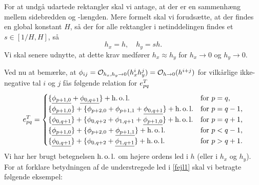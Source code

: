 For at undgå udartede rektangler skal vi antage, at der er en
sammenhæng mellem sidebredden og -længden. Mere formelt skal vi
forudsætte, at der findes en global konstant $H$, så der for alle
rektangler i netinddelingen findes et $s\in[1/H,H]$, så
\begin{equation}
  h_x=h, \quad h_y=sh.
\end{equation}
Vi skal senere udnytte, at dette krav medfører $h_x \approx h_y$ for
$h_x\rightarrow 0$ og $h_y\rightarrow 0$.

Ved nu at bemærke, at $\phi_{ij} = {\mathcal O}_{h_x,h_y\rightarrow 0}(h_x^ih_y^j)
= {\mathcal O}_{h\rightarrow 0}(h^{i+j})$ for vilkårlige ikke-negative tal $i$
og $j$ fås følgende relation for $e_{pq}^T$
\begin{equation} \label{fejl1}
e_{pq}^T =
  \begin{cases}
    \{ \underline{\phi_{p+1,0}} + \underline{\phi_{0,q+1}} \} + \operatorname{h.o.l.}
      & \text{for $p=q$,} \\
    \{ \underline{\phi_{p+1,0}} \} + \{ \phi_{p+2,0} + \phi_{p+1,1}
      + \underline{\phi_{0,q+1}} \} + \operatorname{h.o.l.} & \text{for $p=q-1$,} \\
    \{ \underline{\phi_{0,q+1}} \} + \{ \phi_{0,q+2} + \phi_{1,q+1}
      + \underline{\phi_{p+1,0}} \} + \operatorname{h.o.l.} & \text{for $p=q+1$,} \\
    \{ \underline{\phi_{p+1,0}} \} + \{ \phi_{p+2,0} +
      \underline{\phi_{p+1,1}} \} + \operatorname{h.o.l.} & \text{for $p<q-1$,} \\
    \{ \underline{\phi_{0,q+1}} \} + \{ \phi_{0,q+2} +
      \underline{\phi_{1,q+1}} \} + \operatorname{h.o.l.} & \text{for $p>q+1$.}
  \end{cases}
\end{equation}
Vi har her brugt betegnelsen $\operatorname{h.o.l.}$ om højere ordens led i $h$ (eller
i $h_x$ og $h_y$). For at forklare betydningen af de understregede led
i \eqref{fejl1} skal vi betragte følgende eksempel:


